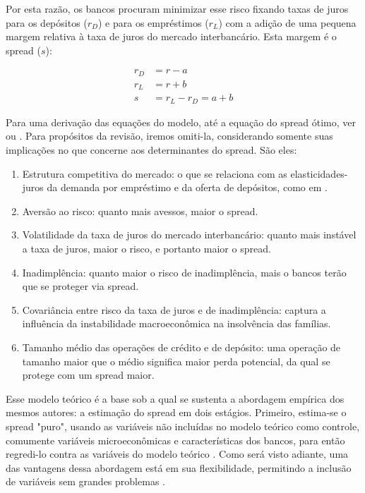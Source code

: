 \documentclass[a4paper,
               article,
               12pt,
               openany,
               oneside,
               english,
               brazil]{abntex2}
\numberwithin{equation}{section}
\begin{document}
    Por esta razão, os bancos procuram minimizar esse risco fixando taxas de juros para os depósitos ($r_D$) e para os empréstimos ($r_L$) com a adição de uma pequena margem relativa à taxa de juros do mercado interbancário. Esta margem é o spread ($s$):

	\begin{align}
        r_D &= r - a \\
        r_L &= r + b \\
        s &= r_L - r_D = a + b
	\end{align}

    Para uma derivação das equações do modelo, até a equação do spread ótimo, ver  ou . Para propósitos da revisão, iremos omiti-la, considerando somente suas implicações no que concerne aos determinantes do spread. São eles:

	\begin{enumerate}
		\item Estrutura competitiva do mercado: o que se relaciona com as elasticidades-juros da demanda por empréstimo e da oferta de depósitos, como em .
		\item Aversão ao risco: quanto mais avessos, maior o spread.
		\item Volatilidade da taxa de juros do mercado interbancário: quanto mais instável a taxa de juros, maior o risco, e portanto maior o spread.
		\item Inadimplência: quanto maior o risco de inadimplência, mais o bancos terão que se proteger via spread.
		\item Covariância entre risco da taxa de juros e de inadimplência: captura a influência da instabilidade macroeconômica na insolvência das famílias. \cite{oreiro}
		\item Tamanho médio das operações de crédito e de depósito: uma operação de tamanho maior que o médio significa maior perda potencial, da qual se protege com um spread maior.
	\end{enumerate}

    Esse modelo teórico é a base sob a qual se sustenta a abordagem empírica dos mesmos autores: a estimação do spread em dois estágios. Primeiro, estima-se o spread "puro", usando as variáveis não incluídas no modelo teórico como controle, comumente variáveis microeconômicas e características dos bancos, para então regredi-lo contra as variáveis do modelo teórico . Como será visto adiante, uma das vantagens dessa abordagem está em sua flexibilidade, permitindo a inclusão de variáveis sem grandes problemas .
\end{document}

